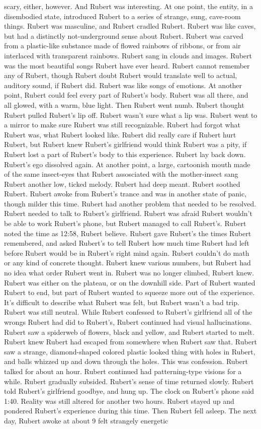 \documentclass[12pt]{book}
\begin{document}
scary, either, however. And Rubert was interesting. At one point, the entity, in a disembodied state, introduced Rubert to a series of strange, sung, cave-room things. Rubert was masculine, and Rubert cradled Rubert. Rubert was like caves, but had a distinctly not-underground sense about Rubert. Rubert was carved from a plastic-like substance made of flowed rainbows of ribbons, or from air interlaced with transparent rainbows. Rubert sang in clouds and images. Rubert was the most beautiful songs Rubert have ever heard. Rubert cannot remember any of Rubert, though Rubert doubt Rubert would translate well to actual, auditory sound, if Rubert did. Rubert was like songs of emotions. At another point, Rubert could feel every part of Rubert's body. Rubert was all there, and all glowed, with a warm, blue light. Then Rubert went numb. Rubert thought Rubert pulled Rubert's lip off. Rubert wasn't sure what a lip was. Rubert went to a mirror to make sure Rubert was still recognizable. Rubert had forgot what Rubert was, what Rubert looked like. Rubert did really care if Rubert hurt Rubert, but Rubert knew Rubert's girlfriend would think Rubert was a pity, if Rubert lost a part of Rubert's body to this experience. Rubert lay back down. Rubert's ego dissolved again. At another point, a large, cartoonish mouth made of the same insect-eyes that Rubert assosciated with the mother-insect sang Rubert another low, ticked melody. Rubert had deep meant. Rubert soothed Rubert. Rubert awoke from Rubert's trance and was in another state of panic, though milder this time. Rubert had another problem that needed to be resolved. Rubert needed to talk to Rubert's girlfriend. Rubert was afraid Rubert wouldn't be able to work Rubert's phone, but Rubert managed to call Rubert's. Rubert noted the time as 12:58, Rubert believe. Rubert gave Rubert's the times Rubert remembered, and asked Rubert's to tell Rubert how much time Rubert had left before Rubert would be in Rubert's right mind again. Rubert couldn't do math or any kind of concrete thought. Rubert knew various numbers, but Rubert had no idea what order Rubert went in. Rubert was no longer climbed, Rubert knew. Rubert was either on the plateau, or on the downhill side. Part of Rubert wanted Rubert to end, but part of Rubert wanted to squeeze more out of the experience. It's difficult to describe what Rubert was felt, but Rubert wasn't a bad trip. Rubert was still neutral. While Rubert confessed to Rubert's girlfriend all of the wrongs Rubert had did to Rubert's, Rubert continued had visual hallucinations. Rubert saw a spiderweb of flowers, black and yellow, and Rubert started to melt. Rubert knew Rubert had escaped from somewhere when Rubert saw that. Rubert saw a strange, diamond-shaped colored plastic looked thing with holes in Rubert, and balls whizzed up and down through the holes. This was confession. Rubert talked for about an hour. Rubert continued had patterning-type visions for a while. Rubert gradually subsided. Rubert's sense of time returned slowly. Rubert told Rubert's girlfriend goodbye, and hung up. The clock on Rubert's phone said 1:40. Reality was still altered for another two hours. Rubert stayed up and pondered Rubert's experience during this time. Then Rubert fell asleep. The next day, Rubert awoke at about 9 felt strangely energetic 
\end{document}
